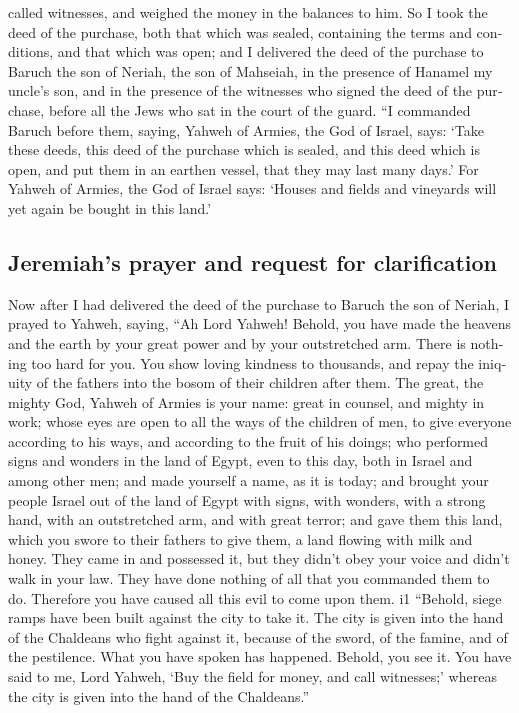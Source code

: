 \begin{paracol}{2}
\begin{otherlanguage}{english}
called witnesses, and weighed the money in the balances to him.
 So I took the deed of the purchase, both that which was
sealed, containing the terms and conditions, and that which was open;
 and I delivered the deed of the purchase to Baruch the
son of Neriah, the son of Mahseiah, in the presence of Hanamel my
uncle's son, and in the presence of the witnesses who signed the deed of
the purchase, before all the Jews who sat in the court of the guard.
 ``I commanded Baruch before them, saying,
 Yahweh of Armies, the God of Israel, says: `Take these
deeds, this deed of the purchase which is sealed, and this deed which is
open, and put them in an earthen vessel, that they may last many days.'
 For Yahweh of Armies, the God of Israel says: `Houses
and fields and vineyards will yet again be bought in this land.'

\hypertarget{jeremiahs-prayer-and-request-for-clarification}{%
\subsection{Jeremiah's prayer and request for
clarification}\label{jeremiahs-prayer-and-request-for-clarification}}

 Now after I had delivered the deed of the purchase to
Baruch the son of Neriah, I prayed to Yahweh, saying, 
``Ah Lord Yahweh! Behold, you have made the heavens and the earth by
your great power and by your outstretched arm. There is nothing too hard
for you.  You show loving kindness to thousands, and
repay the iniquity of the fathers into the bosom of their children after
them. The great, the mighty God, Yahweh of Armies is your name:
 great in counsel, and mighty in work; whose eyes are
open to all the ways of the children of men, to give everyone according
to his ways, and according to the fruit of his doings; 
who performed signs and wonders in the land of Egypt, even to this day,
both in Israel and among other men; and made yourself a name, as it is
today;  and brought your people Israel out of the land of
Egypt with signs, with wonders, with a strong hand, with an outstretched
arm, and with great terror;  and gave them this land,
which you swore to their fathers to give them, a land flowing with milk
and honey.  They came in and possessed it, but they
didn't obey your voice and didn't walk in your law. They have done
nothing of all that you commanded them to do. Therefore you have caused
all this evil to come upon them. i1  ``Behold, siege
ramps have been built against the city to take it. The city is given
into the hand of the Chaldeans who fight against it, because of the
sword, of the famine, and of the pestilence. What you have spoken has
happened. Behold, you see it.  You have said to me, Lord
Yahweh, `Buy the field for money, and call witnesses;' whereas the city
is given into the hand of the Chaldeans.''


\end{otherlanguage}
\end{paracol}
